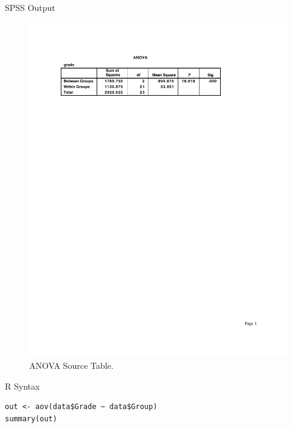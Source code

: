 \documentclass[11pt, oneside]{article}   	%
\begin{document}
SPSS Output
\begin{figure}[h!]
  \centering
  \includegraphics[width=\linewidth]{2eOutputSPSS.pdf}
  \caption{ANOVA Source Table.}
  \label{fig:SPSS2}
\end{figure}

R Syntax
\begin{lstlisting}[language=Rplus]
out <- aov(data$Grade ~ data$Group)
summary(out)
\end{lstlisting}
\end{document}
